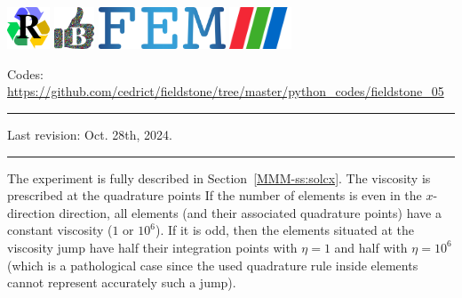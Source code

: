 \noindent
\includegraphics[height=1.25cm]{images/pictograms/replication}
\includegraphics[height=1.25cm]{images/pictograms/benchmark}
\includegraphics[height=1.25cm]{images/pictograms/FEM}
\includegraphics[height=1.25cm]{images/pictograms/paraview}


%

\begin{center}
\inpython
\infortran
{\small Codes: \url{https://github.com/cedrict/fieldstone/tree/master/python_codes/fieldstone_05}}
\end{center}

\par\noindent\rule{\textwidth}{0.4pt}

Last revision: Oct. 28th, 2024.

\par\noindent\rule{\textwidth}{0.4pt}


The experiment is fully described in Section~\ref{MMM-ss:solcx}.
The viscosity is prescribed at the quadrature points 
If the number of elements is even in the $x$-direction direction, all elements 
(and their associated quadrature points)
have a constant viscosity ($1$ or  $10^6$). If it is odd, then the elements situated 
at the viscosity jump have half their integration points with $\eta=1$ and half 
with $\eta=10^6$ 
(which is a pathological case since the used quadrature rule inside elements cannot represent 
accurately such a jump).  

